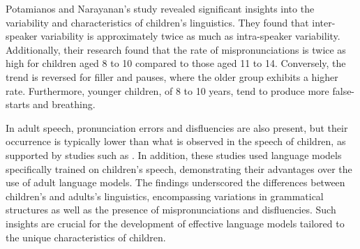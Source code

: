 Potamianos and Narayanan's study \cite{language_children2} revealed significant insights into the variability and characteristics of children's linguistics. They found that inter-speaker variability is approximately twice as much as intra-speaker variability. Additionally, their research found that the rate of mispronunciations is twice as high for children aged 8 to 10 compared to those aged 11 to 14. Conversely, the trend is reversed for filler and pauses, where the older group exhibits a higher rate. Furthermore, younger children, of 8 to 10 years, tend to produce more false-starts and breathing.


In adult speech, pronunciation errors and disfluencies are also present, but their occurrence is typically lower than what is observed in the speech of children, as supported by studies such as \cite{Children_language_model,children_language_model2}. In addition, these studies used language models specifically trained on children's speech, demonstrating their advantages over the use of adult language models. The findings underscored the differences between children's and adults's linguistics, encompassing variations in grammatical structures as well as the presence of mispronunciations and disfluencies. Such insights are crucial for the development of effective language models tailored to the unique characteristics of children.



